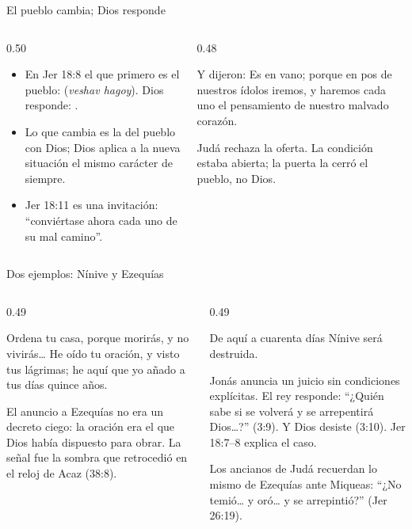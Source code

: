\begin{frame}{El pueblo cambia; Dios responde}
\begin{columns}[t,onlytextwidth]
\begin{column}{0.50\textwidth}\small
\begin{itemize}
\item En Jer 18:8 el que  primero es el pueblo:  (\emph{veshav hagoy}). Dios responde: .
\item Lo que cambia es la  del pueblo con Dios; Dios aplica a la nueva situación el mismo carácter de siempre.
\item Jer 18:11 es una invitación: ``conviértase ahora cada uno de su mal camino''.
\end{itemize}
\end{column}
\begin{column}{0.48\textwidth}
\begin{cita}Y dijeron: Es en vano; porque en pos de nuestros ídolos iremos, y haremos cada uno el pensamiento de nuestro malvado corazón.\end{cita}
\small Judá rechaza la oferta. La condición estaba abierta; la puerta la cerró el pueblo, no Dios.
\end{column}
\end{columns}\par\smallskip
{}
\end{frame}

\begin{frame}{Dos ejemplos: Nínive y Ezequías}
\begin{columns}[t,onlytextwidth]
\begin{column}{0.49\textwidth}
\begin{cita}Ordena tu casa, porque morirás, y no vivirás\ldots{} He oído tu oración, y visto tus lágrimas; he aquí que yo añado a tus días quince años.\end{cita}
\scriptsize El anuncio a Ezequías no era un decreto ciego: la oración era el  que Dios había dispuesto para obrar. La señal fue la sombra que retrocedió en el reloj de Acaz (38:8).
\end{column}
\begin{column}{0.49\textwidth}
\begin{cita}De aquí a cuarenta días Nínive será destruida.\end{cita}
\scriptsize Jonás anuncia un juicio sin condiciones explícitas. El rey responde: ``¿Quién sabe si se volverá y se arrepentirá Dios\ldots?'' (3:9). Y Dios desiste (3:10). Jer 18:7--8 explica el caso.\par\smallskip
Los ancianos de Judá recuerdan lo mismo de Ezequías ante Miqueas: ``¿No temió\ldots{} y oró\ldots{} y \SENOR{} se arrepintió?'' (Jer 26:19).
\end{column}
\end{columns}
\end{frame}

